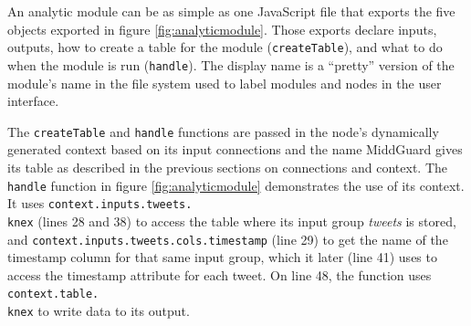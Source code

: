\documentclass[midd]{thesis}
\begin{document}
An analytic module can be as simple as one JavaScript file that exports the five
objects exported in figure \ref{fig:analyticmodule}. Those exports declare
inputs, outputs, how to create a table for the module (\texttt{createTable}),
and what to do when the module is run (\texttt{handle}). The display name is a
``pretty'' version of the module's name in the file system used to label modules
and nodes in the user interface.

The \texttt{createTable} and \texttt{handle} functions are passed in the node's
dynamically generated context based on its input connections and the name
MiddGuard gives its table as described in the previous sections on connections
and context. The \texttt{handle} function in figure \ref{fig:analyticmodule}
demonstrates the use of its context. It uses
\texttt{context.inputs.tweets.\\knex} (lines 28 and 38) to access the table where
its input group \textit{tweets} is stored, and
\texttt{context.inputs.tweets.cols.timestamp} (line 29) to get the name of the
timestamp column for that same input group, which it later (line 41) uses to
access the timestamp attribute for each tweet. On line 48, the function uses
\texttt{context.table.\\knex} to write data to its output.
\end{document}
